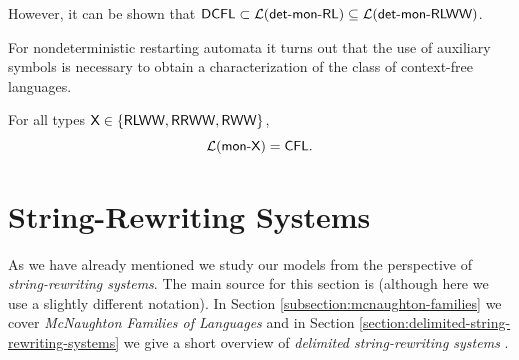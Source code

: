 \noindent However, it can be shown that   $\textup{\sf DCFL} \subset {\cal L}(\textup{\sf det-mon-RL}) \subseteq {\cal L}(\textup{\sf det-mon-RLWW})$.

For nondeterministic restarting automata it turns out that the use of auxiliary symbols is necessary to obtain a characterization of the class of context-free languages.

\index{$\CFL$}
\begin{theorem}
For all types $\textup{\sf X} \in \{\textup{\sf RLWW}, \textup{\sf RRWW}, \textup{\sf RWW}\}$, $${\cal L}(\textup{\sf mon-X}) = \textup{\sf CFL}.$$
\end{theorem}

\section{String-Rewriting Systems}
\label{section:string-rewriting-systems}

As we have already mentioned we study our models from the perspective of \emph{string-rewriting systems}. The main source for this section is \cite{bookOtto93} (although here we use a slightly different notation). In Section \ref{subsection:mcnaughton-families} we cover \emph{McNaughton Families of Languages} \cite{Beaudry2003} and in Section \ref{section:delimited-string-rewriting-systems} we give a short overview of \emph{delimited string-rewriting systems} \cite{Eyraud2007}.

